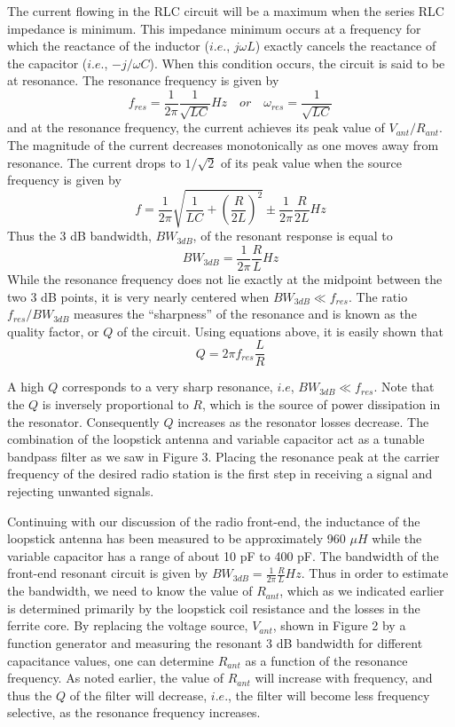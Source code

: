 \documentclass[utf8]{article}
\begin{document}
{	The current flowing in the RLC circuit will be a maximum when the series RLC impedance is minimum. This impedance minimum occurs at a frequency for which the reactance of the inductor ($i.e.$, $j\omega L$) exactly cancels the reactance of the capacitor ($i.e.$, $−j/\omega C$). When this condition occurs, the circuit is said to be at resonance. The resonance frequency is given by
	$$f_{res} = \frac{1}{2\pi}\frac{1}{\sqrt{LC}}Hz \quad or \quad \omega_{res} = \frac{1}{\sqrt{LC}}$$
	and at the resonance frequency, the current achieves its peak value of $V_{ant}/R_{ant}$. The magnitude of the current decreases monotonically as one moves away from resonance. The current drops to $1/\sqrt{2}$ of its peak value when the source frequency is given by
	$$ f = \frac{1}{2\pi}\sqrt{\frac{1}{LC}+(\frac{R}{2L})^2} \pm \frac{1}{2\pi}\frac{R}{2L} Hz$$
	Thus the 3 dB bandwidth, $BW_{3dB}$, of the resonant response is equal to
	$$BW_{3dB} = \frac{1}{2\pi}\frac{R}{L}Hz$$
	While the resonance frequency does not lie exactly at the midpoint between the two 3 dB points, it is very nearly centered when $BW_{3dB}\ll f_{res}$.
	The ratio $f_{res}/BW_{3dB}$ measures the “sharpness” of the resonance and is known as the quality factor, or $Q$ of the circuit. Using equations above, it is easily shown that
	$$Q = 2\pi f_{res}\frac{L}{R}$$

	A high $Q$ corresponds to a very sharp resonance, $i.e$, $BW_{3dB}\ll f_{res}$. Note that the $Q$ is inversely proportional to $R$, which is the source of power dissipation in the resonator. Consequently $Q$ increases as the resonator losses decrease. The combination of the loopstick antenna and variable capacitor act as a tunable bandpass filter as we saw in Figure 3. Placing the resonance peak at the carrier frequency of the desired radio station is the first step in receiving a signal and rejecting unwanted signals.

	Continuing with our discussion of the radio front-end, the inductance of the loopstick antenna has been measured to be approximately 960 $\mu H$ while the variable capacitor has a range of about 10 pF to 400 pF. The bandwidth of the front-end resonant circuit is given by $BW_{3dB} = \frac{1}{2\pi}\frac{R}{L}Hz$. Thus in order to estimate the bandwidth, we need to know the value of $R_{ant}$, which as we indicated earlier is determined primarily by the loopstick coil resistance and the losses in the ferrite core. By replacing the voltage source, $V_{ant}$, shown in Figure 2 by a function generator and measuring the resonant 3 dB bandwidth for different capacitance values, one can determine $R_{ant}$ as a function of the resonance frequency. As noted earlier, the value of $R_{ant}$ will increase with frequency, and thus the $Q$ of the filter will decrease, $i.e.$, the filter will become less frequency selective, as the resonance frequency increases.

}
\end{document}

